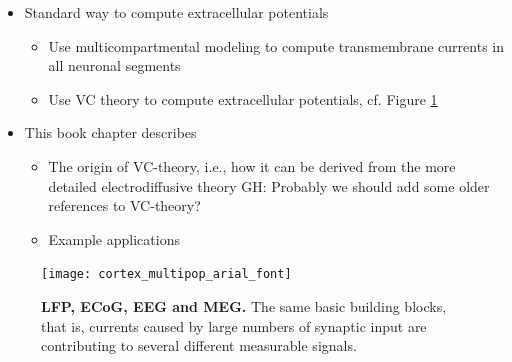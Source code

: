\documentclass[preprint,11pt,authoryear]{elsarticle}
\begin{document}
\begin{itemize}
\begin{itemize}
\item Standard way to compute extracellular potentials
\begin{itemize} 
\item Use multicompartmental modeling to compute transmembrane currents  in all neuronal segments
\item Use VC theory to compute extracellular potentials, cf. Figure \ref{fig:multimodal}
\end{itemize}
%
\item This book chapter describes
\begin{itemize}
\item The origin of VC-theory, i.e., how it can be derived from the more detailed electrodiffusive theory 
GH: Probably we should add some older references to VC-theory?
\item Example applications
\end{itemize}

\end{itemize}
\end{itemize}

\begin{figure}[!ht]
\begin{center}
\texttt{[image: cortex\_multipop\_arial\_font]}
\end{center}
\caption{\textbf{LFP, ECoG, EEG and MEG.} The same basic building blocks, that is, currents caused by large numbers of synaptic input are contributing to several different measurable signals.}
\label{fig:multimodal}
\end{figure}
\end{document}
